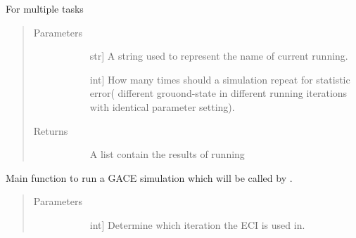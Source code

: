 \documentclass[letterpaper,10pt,english]{sphinxmanual}
\begin{document}
\begin{fulllineitems}
\begin{fulllineitems}
\begin{quote}
\begin{description}
\begin{description}
\end{description}

\end{description}\end{quote}

\end{fulllineitems}


\begin{fulllineitems}
\label{\detokenize{pygace.examples.hfo2:pygace.examples.hfo2.hfo2_gace.HFO2App.multiple_run}}
For multiple tasks
\begin{quote}\begin{description}
\item[{Parameters}] \leavevmode\begin{description}
\item[{}] \leavevmode{[}str{]}
A string used to represent the name of current running.

\item[{}] \leavevmode{[}int{]}
How many times should a simulation repeat for statistic error(
different grouond-state in different running iterations with
identical parameter setting).

\end{description}

\item[{Returns}] \leavevmode\begin{description}
\item[{}] \leavevmode
A list contain the results of running

\end{description}

\end{description}\end{quote}

\end{fulllineitems}


\begin{fulllineitems}
\label{\detokenize{pygace.examples.hfo2:pygace.examples.hfo2.hfo2_gace.HFO2App.run}}
Main function to run a GACE simulation which will be called by
.
\begin{quote}\begin{description}
\item[{Parameters}] \leavevmode\begin{description}
\item[{}] \leavevmode{[}int{]}
Determine which iteration the ECI is used in.


\end{description}
\end{description}
\end{quote}
\end{fulllineitems}
\end{fulllineitems}
\end{document}
